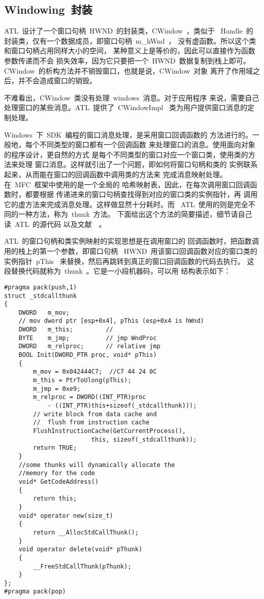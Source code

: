 \subsection{Windowing~封装}

ATL~设计了一个窗口句柄~HWND~的封装类，CWindow~，类似于
~Handle~的封装类，仅有一个数据成员，即窗口句柄~m\_hWnd~，
没有虚函数。所以这个类和窗口句柄占用同样大小的空间，
某种意义上是等价的，因此可以直接作为函数参数传递而不会
损失效率，因为它只要把一个~HWND~数据复制到栈上即可。
CWindow~的析构方法并不销毁窗口，也就是说，CWindow~对象
离开了作用域之后，并不会造成窗口的销毁。

不难看出，CWindow~类没有处理~windows~消息。对于应用程序
来说，需要自己处理窗口的某些消息。ATL~提供了~CWindowImpl~
类为用户提供窗口消息的定制处理。

Windows~下~SDK~编程的窗口消息处理，是采用窗口回调函数的
方法进行的。一般地，每个不同类型的窗口都有一个回调函数
来处理窗口的消息。使用面向对象的程序设计，更自然的方式
是每个不同类型的窗口对应一个窗口类，使用类的方法来处理
窗口消息。这样就引出了一个问题，即如何将窗口句柄和类的
实例联系起来，从而能在窗口的回调函数中调用类的方法来
完成消息映射处理。在~MFC~框架中使用的是一个全局的
哈希映射表，因此，在每次调用窗口回调函数时，都要根据
传递进来的窗口句柄查找得到对应的窗口类的实例指针，再
调用它的虚方法来完成消息处理。这样做显然十分耗时。而
~ATL~使用的则是完全不同的一种方法，称为~thunk~方法。
下面给出这个方法的简要描述，细节请自己读~ATL~的源代码
以及文献~\cite{ATLjsnm:2003}~。

ATL~的窗口句柄和类实例映射的实现思想是在调用窗口的
回调函数时，把函数调用的栈上的第一个参数，即窗口句柄
~HWND~用该窗口回调函数对应的窗口类的实例指针~pThis~
来替换，然后再跳转到真正的窗口回调函数的代码去执行。
这段替换代码就称为~thunk~。它是一小段机器码，可以用
结构表示如下：
\ttfamily
\begin{lstlisting}
#pragma pack(push,1)
struct _stdcallthunk
{
    DWORD   m_mov;
    // mov dword ptr [esp+0x4], pThis (esp+0x4 is hWnd)
    DWORD   m_this;         //
    BYTE    m_jmp;          // jmp WndProc
    DWORD   m_relproc;      // relative jmp
    BOOL Init(DWORD_PTR proc, void* pThis)
    {
        m_mov = 0x042444C7;  //C7 44 24 0C
        m_this = PtrToUlong(pThis);
        m_jmp = 0xe9;
        m_relproc = DWORD((INT_PTR)proc
            - ((INT_PTR)this+sizeof(_stdcallthunk)));
        // write block from data cache and
        //  flush from instruction cache
        FlushInstructionCache(GetCurrentProcess(),
                        this, sizeof(_stdcallthunk));
        return TRUE;
    }
    //some thunks will dynamically allocate the
    //memory for the code
    void* GetCodeAddress()
    {
        return this;
    }
    void* operator new(size_t)
    {
        return __AllocStdCallThunk();
    }
    void operator delete(void* pThunk)
    {
        __FreeStdCallThunk(pThunk);
    }
};
#pragma pack(pop)
\end{lstlisting}

